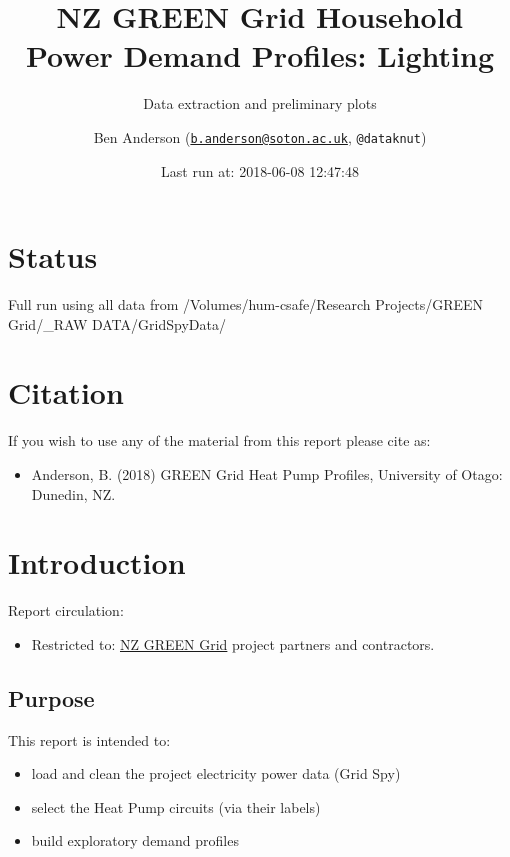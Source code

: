 \documentclass[]{article}
\title{NZ GREEN Grid Household Power Demand Profiles: Lighting}
\subtitle{Data extraction and preliminary plots}
\author{Ben Anderson
(\href{mailto:b.anderson@soton.ac.uk}{\nolinkurl{b.anderson@soton.ac.uk}},
\texttt{@dataknut})}
\date{Last run at: 2018-06-08 12:47:48}
\providecommand{\tightlist}{%
  \setlength{\itemsep}{0pt}\setlength{\parskip}{0pt}}
\begin{document}
\maketitle

{
\setcounter{tocdepth}{2}
\tableofcontents
}
\newpage

\section{Status}\label{status}

Full run using all data from /Volumes/hum-csafe/Research Projects/GREEN
Grid/\_RAW DATA/GridSpyData/

\section{Citation}\label{citation}

If you wish to use any of the material from this report please cite as:

\begin{itemize}
\tightlist
\item
  Anderson, B. (2018) GREEN Grid Heat Pump Profiles, University of
  Otago: Dunedin, NZ.
\end{itemize}

\newpage

\section{Introduction}\label{introduction}

Report circulation:

\begin{itemize}
\tightlist
\item
  Restricted to:
  \href{https://www.otago.ac.nz/centre-sustainability/research/energy/otago050285.html}{NZ
  GREEN Grid} project partners and contractors.
\end{itemize}

\subsection{Purpose}\label{purpose}

This report is intended to:

\begin{itemize}
\tightlist
\item
  load and clean the project electricity power data (Grid Spy)
\item
  select the Heat Pump circuits (via their labels)
\item
  build exploratory demand profiles
\end{itemize}
\end{document}
